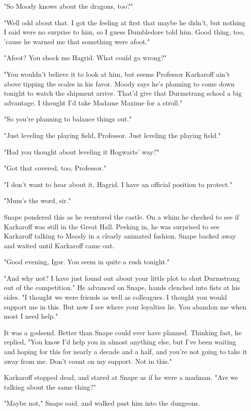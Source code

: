 "So Moody knows about the dragons, too?"

"Well odd about that. I got the feeling at first that maybe he didn't, but nothing I said were no surprise to him, so I guess Dumbledore told him. Good thing, too, 'cause he warned me that something were afoot."

"Afoot? You shock me Hagrid. What could go wrong?"

"You wouldn't believe it to look at him, but seems Professor Karkaroff ain't above tipping the scales in his favor. Moody says he's planning to come down tonight to watch the shipment arrive. That'd give that Durmstrang school a big advantage. I thought I'd take Madame Maxime for a stroll."

"So you're planning to balance things out."

"Just leveling the playing field, Professor. Just leveling the playing field."

"Had you thought about leveling it Hogwarts' way?"

"Got that covered, too, Professor."

"I don't want to hear about it, Hagrid. I have an official position to protect."

"Mum's the word, sir."

Snape pondered this as he reentered the castle. On a whim he checked to see if Karkaroff was still in the Great Hall. Peeking in, he was surprised to see Karkaroff talking to Moody in a clearly animated fashion. Snape backed away and waited until Karkaroff came out.

"Good evening, Igor. You seem in quite a rush tonight."

"And why not? I have just found out about your little plot to shut Durmstrang out of the competition." He advanced on Snape, hands clenched into fists at his sides. "I thought we were friends as well as colleagues. I thought you would support me in this. But now I see where your loyalties lie. You abandon me when most I need help."

It was a godsend. Better than Snape could ever have planned. Thinking fast, he replied, "You know I'd help you in almost anything else, but I've been waiting and hoping for this for nearly a decade and a half, and you're not going to take it away from me. Don't count on my support. Not in this."

Karkaroff stopped dead, and stared at Snape as if he were a madman. "Are we talking about the same thing?"

"Maybe not," Snape said, and walked past him into the dungeons.

